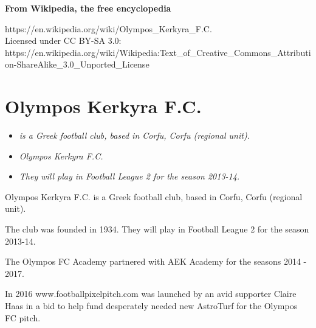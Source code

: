 \textbf{From Wikipedia, the free encyclopedia}

https://en.wikipedia.org/wiki/Olympos\_Kerkyra\_F.C.\\
Licensed under CC BY-SA 3.0:\\
https://en.wikipedia.org/wiki/Wikipedia:Text\_of\_Creative\_Commons\_Attribution-ShareAlike\_3.0\_Unported\_License

\section{Olympos Kerkyra F.C.}\label{olympos-kerkyra-f.c.}

\begin{itemize}
\item
  \emph{is a Greek football club, based in Corfu, Corfu (regional
  unit).}
\item
  \emph{Olympos Kerkyra F.C.}
\item
  \emph{They will play in Football League 2 for the season 2013-14.}
\end{itemize}

Olympos Kerkyra F.C. is a Greek football club, based in Corfu, Corfu
(regional unit).

The club was founded in 1934. They will play in Football League 2 for
the season 2013-14.

The Olympos FC Academy partnered with AEK Academy for the seasons 2014 -
2017.

In 2016 www.footballpixelpitch.com was launched by an avid supporter
Claire Haas in a bid to help fund desperately needed new AstroTurf for
the Olympos FC pitch.
